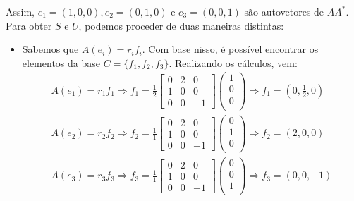 \documentclass[11pt,a4paper]{article}
\begin{document}
{Assim, $e_1 = (1,0,0), e_2 = (0,1,0)$ e $e_3 = (0, 0, 1)$ são autovetores de $AA^{*}.$ 
Para obter $S$ e $U$, podemos proceder de duas maneiras distintas:

\begin{itemize}
    \item Sabemos que $A(e_i) = r_if_i.$ Com base nisso, é possível encontrar os elementos da base $C = \{f_1, f_2, f_3 \}.$ Realizando os cálculos, vem:
    \[
    \begin{array}{l}
    A(e_1) = r_1f_1 \Rightarrow f_1 = \frac{1}{2} \begin{bmatrix}
0 & 2 & 0 \\
1 & 0 & 0 \\
0 & 0 & -1
\end{bmatrix} \begin{pmatrix}
1 \\
0 \\
0 \\
\end{pmatrix} \Rightarrow f_1 = \left(0, \frac{1}{2}, 0 \right)    \\
              A(e_2) = r_2f_2 \Rightarrow f_2 = \frac{1}{1} \begin{bmatrix}
0 & 2 & 0 \\
1 & 0 & 0 \\
0 & 0 & -1
\end{bmatrix} \begin{pmatrix}
0 \\
1 \\
0 \\
\end{pmatrix} \Rightarrow f_2 = \left(2, 0 , 0 \right)  \\
         A(e_3) = r_3f_3 \Rightarrow f_3 = \frac{1}{1} \begin{bmatrix}
0 & 2 & 0 \\
1 & 0 & 0 \\
0 & 0 & -1
\end{bmatrix} \begin{pmatrix}
0 \\
0 \\
1 \\
\end{pmatrix} \Rightarrow f_3 = \left(0, 0 , -1 \right)  \\
    \end{array}
    \]


\end{itemize}}
\end{document}
